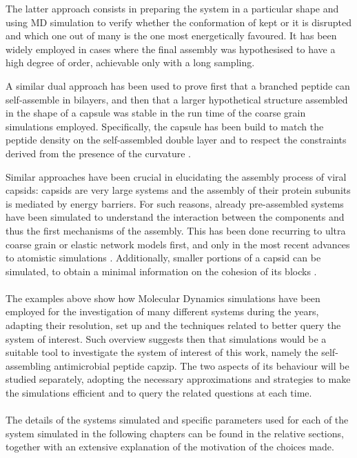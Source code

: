 The latter approach consists in preparing the system in a particular shape and using MD simulation to verify whether the conformation of kept or it is disrupted and which one out of many is the one most energetically favoured. It has been widely employed in cases where the final assembly was hypothesised to have a high degree of order, achievable only with a long sampling. 

A similar dual approach has been used to prove first that a branched peptide can self-assemble in bilayers, and then that a larger hypothetical structure assembled in the shape of a capsule was stable in the run time of the coarse grain simulations employed. Specifically, the capsule has been build to match the peptide density on the self-assembled double layer and to respect the constraints derived from the presence of the curvature \cite{Gudlur2012}.

Similar approaches have been crucial in elucidating the assembly process of viral capsids: capsids are very large systems and the assembly of their protein subunits is mediated by energy barriers. For such reasons, already pre-assembled systems have been simulated to understand the interaction between the components and thus the first mechanisms of the assembly. This has been done recurring to ultra coarse grain or elastic network models \cite{Grime2016} first, and only in the most recent advances to atomistic simulations \cite{Perilla2016,Hadden2018}. Additionally, smaller portions of a capsid can be simulated, to obtain a minimal information on the cohesion of its blocks \cite{AbiMansour2014}.


\paragraph{}
The examples above show how Molecular Dynamics simulations have been employed for the investigation of many different systems during the years, adapting their resolution, set up and the techniques related to better query the system of interest. Such overview suggests then that simulations would be a suitable tool to investigate the system of interest of this work, namely the self-assembling antimicrobial peptide capzip. The two aspects of its behaviour will be studied separately, adopting the necessary approximations and strategies to make the simulations efficient and to query the related questions at each time.

\paragraph{}
The details of the systems simulated and specific parameters used for each of the system simulated in the following chapters can be found in the relative sections, together with an extensive explanation of the motivation of the choices made.
